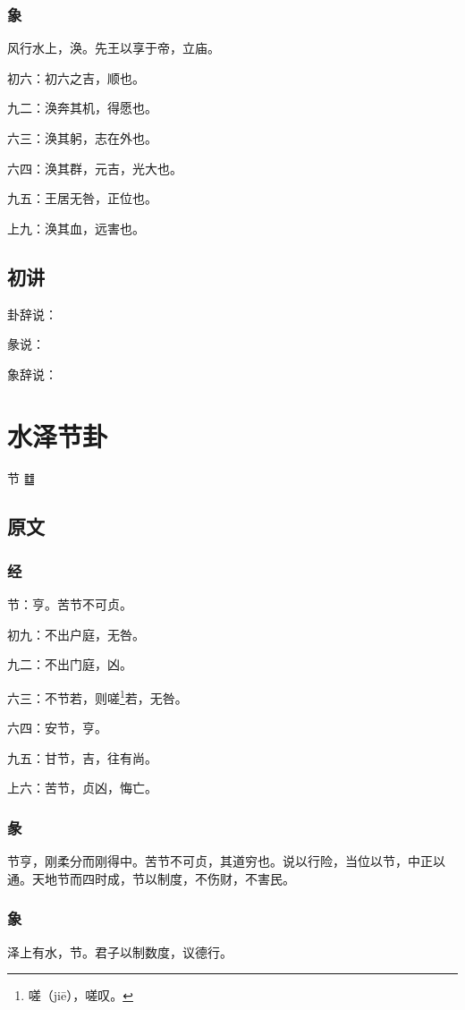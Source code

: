 \documentclass[12pt,oneside]{book}
\begin{document}
\subsection{象}
风行水上，涣。先王以享于帝，立庙。

初六：初六之吉，顺也。

九二：涣奔其机，得愿也。

六三：涣其躬，志在外也。

六四：涣其群，元吉，光大也。

九五：王居无咎，正位也。

上九：涣其血，远害也。

\section{初讲}
卦辞说：

彖说：

象辞说：


\chapter{水泽节卦}
节 {\Large ䷻}


\section{原文}

\subsection{经}
节：亨。苦节不可贞。

初九：不出户庭，无咎。

九二：不出门庭，凶。

六三：不节若，则嗟\footnote{嗟（jiē），嗟叹。}若，无咎。

六四：安节，亨。

九五：甘节，吉，往有尚。

上六：苦节，贞凶，悔亡。


\subsection{彖}
节亨，刚柔分而刚得中。苦节不可贞，其道穷也。说以行险，当位以节，中正以通。天地节而四时成，节以制度，不伤财，不害民。

\subsection{象}
泽上有水，节。君子以制数度，议德行。
\end{document}
